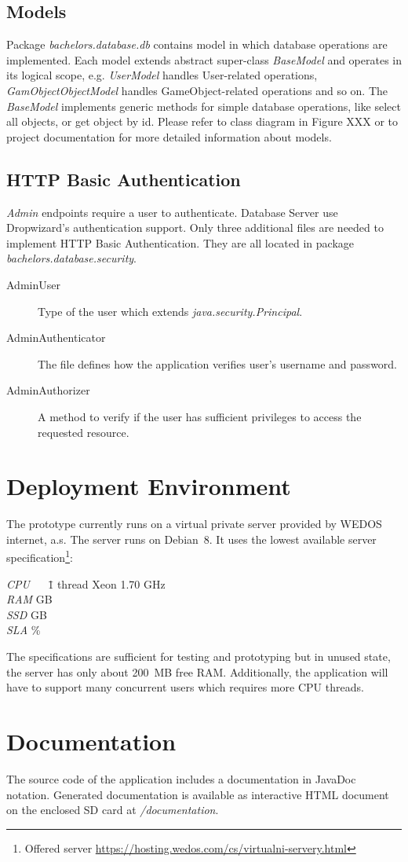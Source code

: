 \subsection{Models}
Package \textit{bachelors.database.db} contains model in which database operations are implemented. Each model extends abstract super-class \textit{BaseModel} and operates in its logical scope, e.g. \textit{UserModel} handles User-related operations, \textit{GamObjectObjectModel} handles GameObject-related operations and so on. The \textit{BaseModel} implements generic methods for simple database operations, like select all objects, or get object by id. Please refer to class diagram in Figure XXX or to project documentation for more detailed information about models.

\subsection{HTTP Basic Authentication} 
\textit{Admin} endpoints require a user to authenticate. Database Server use Dropwizard's authentication support. Only three additional files are needed to implement HTTP Basic Authentication. They are all located in package \textit{bachelors.database.security}. 
\begin{description}
	\item[AdminUser] Type of the user which extends \textit{java.security.Principal}.
	\item[AdminAuthenticator] The file defines how the application verifies user's username and password.
	\item[AdminAuthorizer] A method to verify if the user has sufficient privileges to access the requested resource.
\end{description}

\section{Deployment Environment}
\label{section:deploy}
The prototype currently runs on a virtual private server provided by WEDOS internet, a.s. The server runs on Debian~8. It uses the lowest available server specification\footnote{Offered server \url{https://hosting.wedos.com/cs/virtualni-servery.html}}:
\begin{tabbing}
	\textit{CPU} ~~ \= 1 thread Xeon 1.70 GHz\\
	\textit{RAM}  GB\\
	\textit{SSD}  GB\\
	\textit{SLA} \%
\end{tabbing}

The specifications are sufficient for testing and prototyping but in unused state, the server has only about 200~MB free RAM. Additionally, the application will have to support many concurrent users which requires more CPU threads.  

\section{Documentation}
The source code of the application includes a documentation in JavaDoc notation. Generated documentation is available as interactive HTML document on the enclosed SD card at \textit{/documentation}.